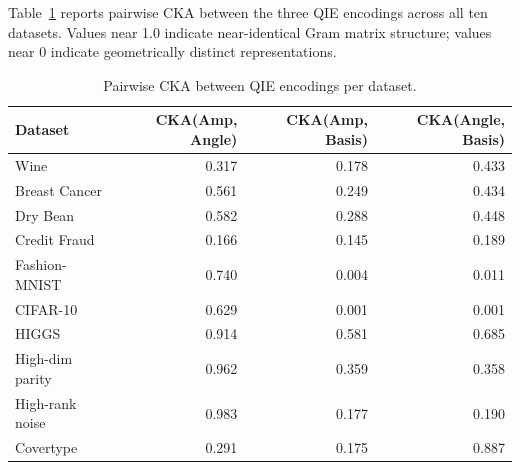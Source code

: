 Table~\ref{tab:cka_full} reports pairwise CKA between the three QIE encodings
across all ten datasets.
Values near 1.0 indicate near-identical Gram matrix structure; values near 0
indicate geometrically distinct representations.

\begin{table}[H]
\centering
\caption{Pairwise CKA between QIE encodings per dataset.}
\label{tab:cka_full}
\small
\begin{tabular}{lrrr}
\toprule
Dataset & CKA(Amp, Angle) & CKA(Amp, Basis) & CKA(Angle, Basis) \\
\midrule
Wine            & 0.317 & 0.178 & 0.433 \\
Breast Cancer   & 0.561 & 0.249 & 0.434 \\
Dry Bean        & 0.582 & 0.288 & 0.448 \\
Credit Fraud    & 0.166 & 0.145 & 0.189 \\
Fashion-MNIST   & 0.740 & 0.004 & 0.011 \\
CIFAR-10        & 0.629 & 0.001 & 0.001 \\
HIGGS           & 0.914 & 0.581 & 0.685 \\
High-dim parity & 0.962 & 0.359 & 0.358 \\
High-rank noise & 0.983 & 0.177 & 0.190 \\
Covertype       & 0.291 & 0.175 & 0.887 \\
\bottomrule
\end{tabular}
\end{table}
